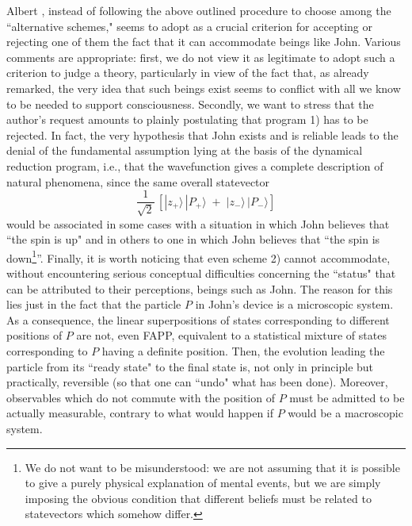 \documentclass[10pt,a4paper]{article}
\begin{document}
Albert \cite{ap}, instead of following the above outlined
procedure to choose among the ``alternative schemes," seems to
adopt as a crucial criterion for accepting or rejecting one of
them the fact that it can accommodate beings like John. Various
comments are appropriate: first, we do not view it as legitimate
to adopt such a criterion to judge a theory, particularly in view
of the fact that, as already remarked, the very idea that such
beings exist seems to conflict with all we know to be needed to
support consciousness. Secondly, we want to stress that the
author's request amounts to plainly postulating that program 1)
has to be rejected. In fact, the very hypothesis that John exists
and is reliable leads to the denial of the fundamental assumption
lying at the basis of the dynamical reduction program, i.e., that
the wavefunction gives a complete description of natural
phenomena, since the same overall statevector
\begin{equation}
\frac{1}{\sqrt{2}}\,\left[ |z_{+}\rangle\, |P_{+}\rangle \; + \;
|z_{-}\rangle\, |P_{-}\rangle \right]
\end{equation}
would be associated in some cases with a situation in which John
believes that ``the spin is up" and in others to one in which John
believes that ``the spin is down\footnote{We do not want to be
misunderstood: we are not assuming that it is possible to give a
purely physical explanation of mental events, but we are simply
imposing the obvious condition that different beliefs must be
related to statevectors which somehow differ.}''. Finally, it is
worth noticing that even scheme 2) cannot accommodate, without
encountering serious conceptual difficulties concerning the
``status" that can be attributed to their perceptions, beings such
as John. The reason for this lies just in the fact that the
particle $P$ in John's device is a microscopic system. As a
consequence, the linear superpositions of states corresponding to
different positions of $P$ are not, even FAPP, equivalent to a
statistical mixture of states corresponding to $P$ having a
definite position. Then, the evolution leading the particle from
its ``ready state" to the final state is, not only in principle
but practically, reversible (so that one can ``undo" what has been
done). Moreover, observables which do not commute with the
position of $P$ must be admitted to be actually measurable,
contrary to what would happen if $P$ would be a macroscopic
system.
\end{document}
